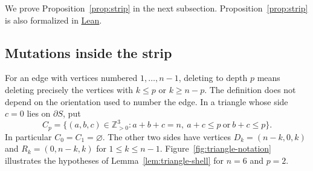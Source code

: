 \documentclass[12pt, letter]{amsart}
\theoremstyle{definition}
\newcommand{\Z}{\mathbb Z}
\numberwithin{equation}{section}
\begin{document}
We prove Proposition~\ref{prop:strip} in the next subsection. Proposition~\ref{prop:strip} is also formalized in \href{https://github.com/Hu-Mingyuan/peeling-strip}{Lean}.


\subsection{Mutations inside the strip}
\label{sec:strip-local}



For an edge with vertices numbered $1,\ldots,n-1$, deleting to
depth $p$ means deleting precisely the vertices with
$k\le p$ or $k\ge n-p$. The definition does not depend on the
orientation used to number the edge.
In a triangle whose side $c=0$ lies on $\partial S$, put
\begin{equation}\label{eq:triangle-corners}
 C_p=\{(a,b,c)\in\Z_{>0}^3:a+b+c=n,
              \ a+c\le p\ \text{or}\ b+c\le p\}.
\end{equation}
In particular $C_0=C_1=\varnothing$.
The other two sides have vertices $D_k=(n-k,0,k)$ and
$R_k=(0,n-k,k)$ for $1\le k\le n-1$.
Figure~\ref{fig:triangle-notation} illustrates the hypotheses of Lemma~\ref{lem:triangle-shell} for $n=6$ and $p=2$.
\end{document}
